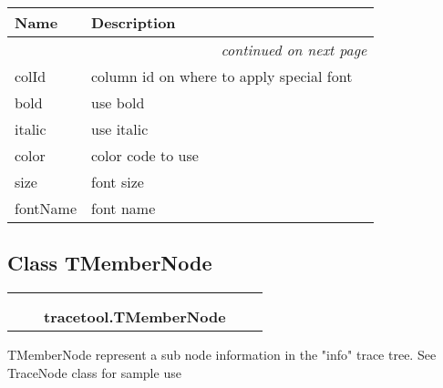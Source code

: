     \vspace{-1cm}
\hspace{\varindent}\begin{longtable}{|p{\varnamewidth}|p{\vardescrwidth}|l}
\cline{1-2}
\cline{1-2} \centering \textbf{Name} & \centering \textbf{Description}& \\
\cline{1-2}
\endhead\cline{1-2}\multicolumn{3}{r}{\small\textit{continued on next page}}\\\endfoot\cline{1-2}
\endlastfoot\raggedright c\-o\-l\-I\-d\- & column id on where to apply special font&\\
\cline{1-2}
\raggedright b\-o\-l\-d\- & use bold&\\
\cline{1-2}
\raggedright i\-t\-a\-l\-i\-c\- & use italic&\\
\cline{1-2}
\raggedright c\-o\-l\-o\-r\- & color code to use&\\
\cline{1-2}
\raggedright s\-i\-z\-e\- & font size&\\
\cline{1-2}
\raggedright f\-o\-n\-t\-N\-a\-m\-e\- & font name&\\
\cline{1-2}
\end{longtable}



\subsection{Class TMemberNode}

    \label{tracetool:TMemberNode}
\begin{tabular}{cccccc}
\multicolumn{2}{r}{\settowidth{\BCL}{object}\multirow{2}{\BCL}{object}}
&&
  \\\cline{3-3}
  &&\multicolumn{1}{c|}{}
&&
  \\
&&\multicolumn{2}{l}{\textbf{tracetool.TMemberNode}}
\end{tabular}

TMemberNode represent a sub node information in the "info" trace tree. See 
TraceNode class for sample use



